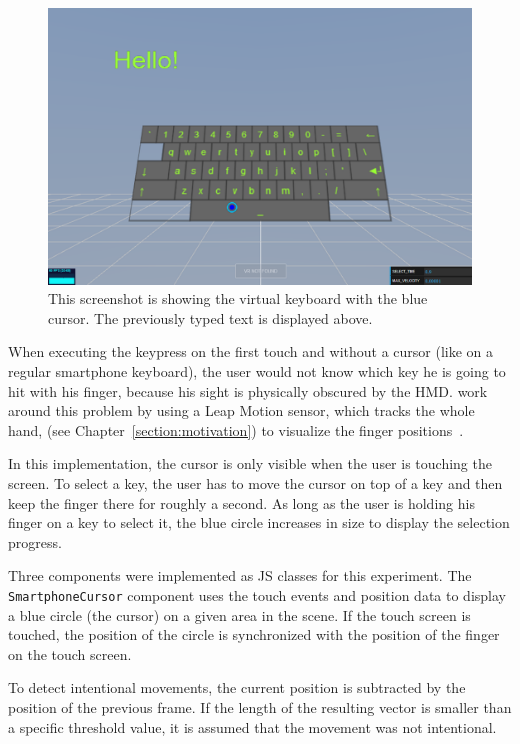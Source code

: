 \begin{figure}[H]
	\centering
	\includegraphics[width=12cm]{figures/implementation/screenshot_exp_vk.png}
	\caption[Screenshot of the virtual keyboard]{This screenshot is showing the virtual keyboard with the blue cursor. The previously typed text is displayed above.}\label{fig:screenshot-exp-vk}
\end{figure}

When executing the keypress on the first touch and without a cursor (like on a regular smartphone keyboard), the user would not know which key he is going to hit with his finger, because his sight is physically obscured by the \gls{HMD}. \citeauthor{Dias.2018} work around this problem by using a Leap Motion sensor, which tracks the whole hand, (see Chapter~\ref{section:motivation}) to visualize the finger positions~\cite[4]{Dias.2018}.

In this implementation, the cursor is only visible when the user is touching the screen. To select a key, the user has to move the cursor on top of a key and then keep the finger there for roughly a second. As long as the user is holding his finger on a key to select it, the blue circle increases in size to display the selection progress.

Three components were implemented as \acrlong{JS} classes for this experiment. The \lstinline{SmartphoneCursor} component uses the touch events and position data to display a blue circle (the cursor) on a given area in the scene. If the touch screen is touched, the position of the circle is synchronized with the position of the finger on the touch screen.

To detect intentional movements, the current position is subtracted by the position of the previous frame. If the length of the resulting vector is smaller than a specific threshold value, it is assumed that the movement was not intentional.

